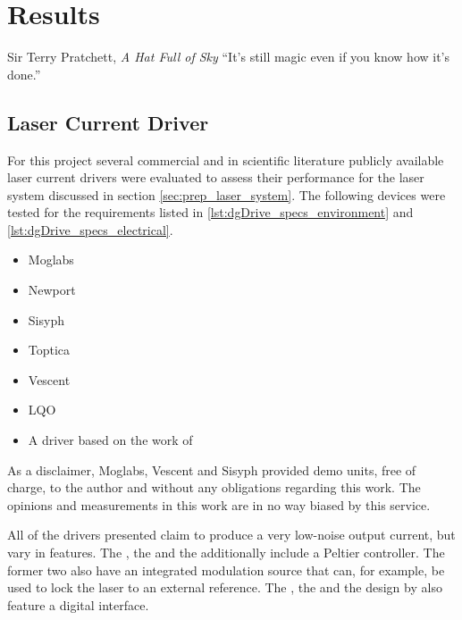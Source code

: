 \chapter{Results}
\label{sec:results}
\begin{chapquote}{Sir Terry Pratchett, \textit{A Hat Full of Sky}}
``It's still magic even if you know how it's done.''
\end{chapquote}

\section{Laser Current Driver}
For this project several commercial and in scientific literature publicly available laser current drivers were evaluated to assess their performance for the laser system discussed in section \ref{sec:prep_laser_system}. The following devices were tested for the requirements listed in \ref{lst:dgDrive_specs_environment} and \ref{lst:dgDrive_specs_electrical}.
\begin{itemize}
    \item Moglabs 
    \item Newport 
    \item Sisyph 
    \item Toptica 
    \item Vescent 
    \item LQO  \cite{datasheet_LQprO}
    \item A driver based on the work of \citeauthor{laser_driver_digital} \cite{laser_driver_digital}
\end{itemize}

As a disclaimer, Moglabs, Vescent and Sisyph provided demo units, free of charge, to the author and without any obligations regarding this work. The opinions and measurements in this work are in no way biased by this service.

All of the drivers presented claim to produce a very low-noise output current, but vary in features. The , the  and the  additionally include a Peltier controller. The former two also have an integrated modulation source that can, for example, be used to lock the laser to an external reference. The , the  and the design by \citeauthor{laser_driver_digital} also feature a digital interface.

